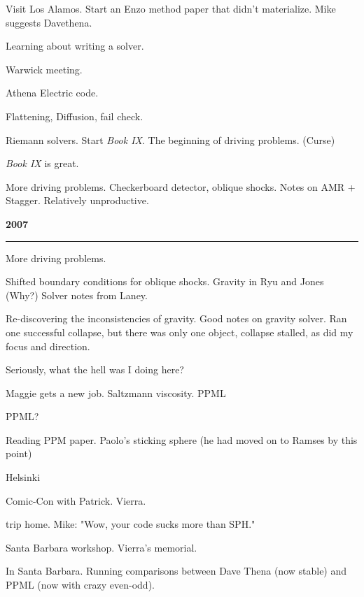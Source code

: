 \documentclass[10pt]{article}
\begin{document}
 Visit Los Alamos.  Start an Enzo method paper that didn't
materialize.  Mike suggests Davethena.

 Learning about writing a solver.  

 Warwick meeting.

 Athena Electric code.

 Flattening, Diffusion, fail check.

 Riemann solvers.  Start \emph{Book IX}. The beginning of driving
problems.  (Curse)

\emph{Book IX} is great.

 More driving problems. Checkerboard detector, oblique
shocks.  Notes on AMR + Stagger.  Relatively unproductive. 


\begin{center}{\bf 2007}\end{center}

\noindent\rule[3pt]{\textwidth}{.1mm}

 More driving problems.  

 Shifted boundary conditions for oblique shocks.  Gravity in Ryu and Jones (Why?)
Solver notes from Laney.

 Re-discovering the inconsistencies of gravity.  Good notes on
gravity solver.  Ran one successful collapse, but there was only one object,
collapse stalled, as did my focus and direction.

Seriously, what the hell was I doing here?

 Maggie gets a new job.  Saltzmann viscosity.  PPML

 PPML?

 Reading PPM paper.  Paolo's sticking sphere (he had moved on to
Ramses by this point)

 Helsinki

 Comic-Con with Patrick.  Vierra.

 trip home.  Mike: "Wow, your code sucks more than SPH."

 Santa Barbara workshop. Vierra's memorial.

 In Santa Barbara.  Running comparisons between Dave
Thena (now stable) and PPML (now with crazy even-odd).
\end{document}
